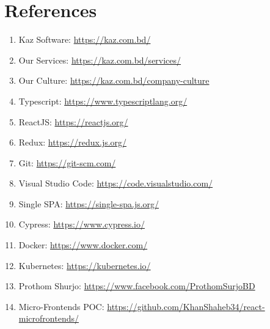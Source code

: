 \chapter{References}

\begin{enumerate}
    \item Kaz Software: \url{https://kaz.com.bd/}
    \item Our Services: \url{https://kaz.com.bd/services/}
    \item Our Culture: \url{https://kaz.com.bd/company-culture}
    \item Typescript: \url{https://www.typescriptlang.org/}
    \item ReactJS: \url{https://reactjs.org/}
    \item Redux: \url{https://redux.js.org/}
    \item Git: \url{https://git-scm.com/}
    \item Visual Studio Code: \url{https://code.visualstudio.com/}
    \item Single SPA: \url{https://single-spa.js.org/}
    \item Cypress: \url{https://www.cypress.io/}
    \item Docker: \url{https://www.docker.com/}
    \item Kubernetes: \url{https://kubernetes.io/}
    \item Prothom Shurjo: \url{https://www.facebook.com/ProthomSurjoBD}
    \item Micro-Frontends POC: \url{https://github.com/KhanShaheb34/react-microfrontends/}
\end{enumerate}